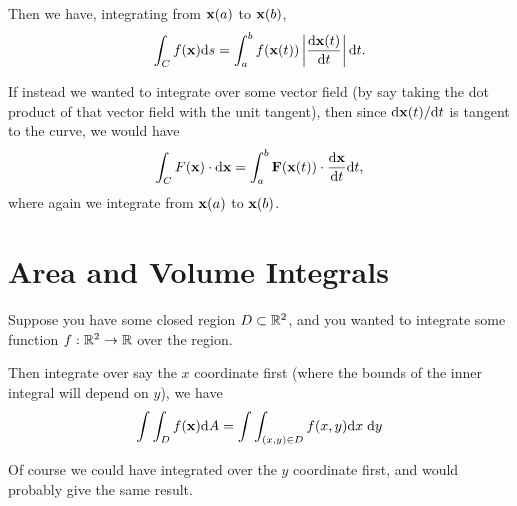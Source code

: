 \documentclass[11pt]{article}
\begin{document}
Then we have, integrating from $\mathbf{x}(a)$ to $\mathbf{x}(b)$,
$$
\int_C f(\mathbf{x}) \dd s = \int_a^b f(\mathbf{x}(t)) \left|\frac{\dd \mathbf{x}(t)}{\dd t}\right| \dd t.
$$

If instead we wanted to integrate over some vector field (by say taking the dot product of that vector field with the unit tangent), then since $\dd \mathbf{x}(t) / \dd t$ is tangent to the curve, we would have
$$
\int_C F(\mathbf{x}) \cdot \dd \mathbf{x} = \int_a^b \mathbf{F}(\mathbf{x}(t)) \cdot \frac{\dd \mathbf{x}}{\dd t} \dd t,
$$
where again we integrate from $\mathbf{x}(a)$ to $\mathbf{x}(b)$.

\section{Area and Volume Integrals}

Suppose you have some closed region $D \subset \mathbb{R}^2$, and you wanted to integrate some function $f: \mathbb{R}^2 \rightarrow \mathbb{R}$ over the region. 

\begin{center}
	



\end{center}

Then integrate over say the $x$ coordinate first (where the bounds of the inner integral will depend on $y$), we have
$$
\int \int_D f(\mathbf{x}) \dd A = \int \int_{(x, y) \in D} f(x, y) \dd x \; \dd y
$$

Of course we could have integrated over the $y$ coordinate first, and would probably give the same result.
\end{document}
